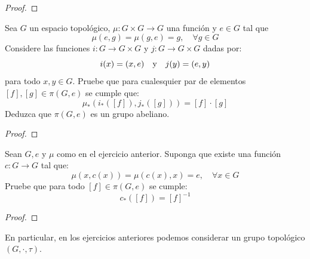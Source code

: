 \documentclass[12pt]{report}
\theoremstyle{largebreak}
\newcommand\cf[3]{\ensuremath{#1:#2\rightarrow#3}}
\begin{document}
    \begin{proof}
        
    \end{proof}

    \begin{excer}
        Sea $G$ un espacio topológico, $\cf{\mu}{G\times G}{G}$ una función y $e\in G$ tal que
        \begin{equation*}
            \mu(e,g)=\mu(g,e)=g,\quad\forall g\in G
        \end{equation*}
        Considere las funciones $\cf{i}{G}{G\times G}$ y $\cf{j}{G}{G\times G}$ dadas por:
        \begin{equation*}
            i(x)=(x,e)\quad\textup{y}\quad j(y)=(e,y)
        \end{equation*}
        para todo $x,y\in G$. Pruebe que para cualesquier par de elementos $[f],[g]\in\pi(G,e)$ se cumple que:
        \begin{equation*}
            \mu_*\left(i_*([f]),j_*([g]) \right)=[f]\cdot[g]
        \end{equation*}
        Deduzca que $\pi(G,e)$ es un grupo abeliano.
    \end{excer}

    \begin{proof}
        
    \end{proof}

    \begin{excer}
        Sean $G,e$ y $\mu$ como en el ejercicio anterior. Suponga que existe una función $\cf{c}{G}{G}$ tal que:
        \begin{equation*}
            \mu(x,c(x))=\mu(c(x),x)=e,\quad\forall x\in G
        \end{equation*}
        Pruebe que para todo $[f]\in\pi(G,e)$ se cumple:
        \begin{equation*}
            c_*([f])=[f]^{-1}
        \end{equation*}
    \end{excer}

    \begin{proof}
        
    \end{proof}
    
    \begin{obs}
        En particular, en los ejercicios anteriores podemos considerar un grupo topológico $(G,\cdot,\tau)$.
    \end{obs}
\end{document}
